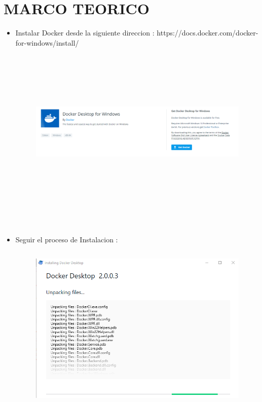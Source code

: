 \section{MARCO TEORICO} 

\begin{itemize}
\subsection{Instalacion de Docker}
	
	\item Instalar Docker desde la siguiente direccion :
	https://docs.docker.com/docker-for-windows/install/
	\begin{figure}[htb]
	\begin{center}
	\includegraphics[width=18cm, height=8cm]{./Imagenes/docker}
	\end{center}
	\end{figure}\\
	
	\item Seguir el proceso de Instalacion :\\
	\begin{figure}[htb]
	\begin{center}
	\includegraphics[width=18cm, height=8cm]{./Imagenes/dockerinst}
	\end{center}
	\end{figure}\\
	

\end{itemize}
